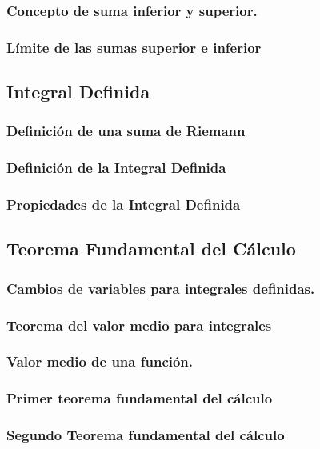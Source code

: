\subsubsection{Concepto de suma inferior y superior.}
\subsubsection{Límite de las sumas superior e inferior}
\subsection{Integral Definida}
\subsubsection{Definición de una suma de Riemann}
\subsubsection{Definición de la Integral Definida}
\subsubsection{Propiedades de la Integral Definida}
\subsection{Teorema Fundamental del Cálculo}
\subsubsection{Cambios de variables para integrales definidas.}
\subsubsection{Teorema del valor medio para integrales}
\subsubsection{Valor medio de una función.}
\subsubsection{Primer  teorema fundamental  del  cálculo}
\subsubsection{Segundo Teorema fundamental del cálculo}




